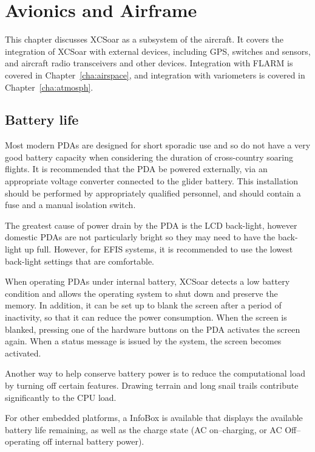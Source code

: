 \chapter{Avionics and Airframe}\label{cha:avionics-airframe}

This chapter discusses XCSoar as a subsystem of the aircraft.  It
covers the integration of XCSoar with external devices, including GPS,
switches and sensors, and aircraft radio transceivers and other
devices.  Integration with FLARM is covered in
Chapter~\ref{cha:airspace}, and integration with variometers is
covered in Chapter~\ref{cha:atmosph}.

\section{Battery life}

Most modern PDAs are designed for short sporadic use and so do not
have a very good battery capacity when considering the duration of
cross-country soaring flights.  It is recommended that the PDA be powered
externally, via an appropriate voltage converter connected to the glider battery. 
This installation should be performed by appropriately qualified personnel, 
and should contain a fuse and a manual isolation switch.

The greatest cause of power drain by the PDA is the LCD back-light,
however domestic PDAs are not particularly bright so they may need to
have the back-light up full. However, for EFIS systems,
it is recommended to use the lowest back-light settings that are
comfortable.

When operating PDAs under internal battery, XCSoar detects a low
battery condition and allows the operating system to shut down and
preserve the memory.  In addition, it can be set up to blank the
screen after a period of inactivity, so that it can reduce the power
consumption.  When the screen is blanked, pressing one of the hardware
buttons on the PDA activates the screen again.  When a status message
is issued by the system, the screen becomes activated.

Another way to help conserve battery power is to reduce the
computational load by turning off certain features.  Drawing terrain
and long snail trails contribute significantly to the CPU load.

For other embedded platforms, a  InfoBox is available that 
displays the available battery life remaining, as well as the charge state 
(AC on--charging, or AC Off--operating off internal battery power).

